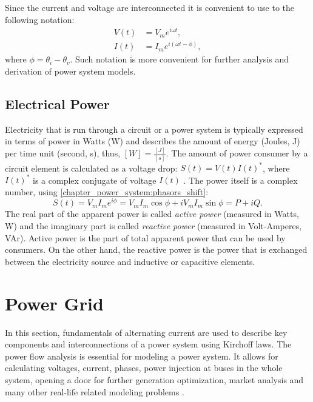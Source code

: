 Since the current and voltage are interconnected it is convenient to use to the following notation:
\begin{equation}
    \begin{aligned}
        V(t) &= V_m e^{i\omega t}, \\
        I(t) &= I_m e^{i(\omega t - \phi)},
    \end{aligned}
    \label{chapter_power_system:phasors_shift}
\end{equation}
where $\phi = \theta_i - \theta_v$. Such notation is more convenient for further analysis and derivation of power system models.

\subsection{Electrical Power}

Electricity that is run through a circuit or a power system is typically expressed in terms of power in Watts (W) and describes the amount of energy (Joules, J) per time unit (second, s), thus, $[W] = \frac{[J]}{[s]}$. The amount of power consumer by a circuit element is calculated as a voltage drop: $S(t) = V(t) I(t)^*$, where $I(t)^*$ is a complex conjugate of voltage $I(t)$ \cite{el2008electric}. The power itself is a complex number, using \eqref{chapter_power_system:phasors_shift}:
\begin{equation}
        S(t) = V_m I_m e^{i\phi} = V_m I_m \cos \phi + i V_m I_m \sin \phi = P + i Q.        
    \label{chapter_power_system:apparent}
\end{equation}
The real part of the apparent power is called \emph{active power} (measured in Watts, W) and the imaginary part is called \emph{reactive power} (measured in Volt-Amperes, VAr). Active power is the part of total apparent power that can be used by consumers. On the other hand, the reactive power is the power that is exchanged between the electricity source and inductive or capacitive elements. 

\section{Power Grid}

In this section, fundamentals of alternating current are used to describe key components and interconnections of a power system using Kirchoff laws. The power flow analysis is essential for modeling a power system. It allows for calculating voltages, current, phases, power injection at buses in the whole system, opening a door for further generation optimization, market analysis and many other real-life related modeling problems \cite{machowski2020power}.


